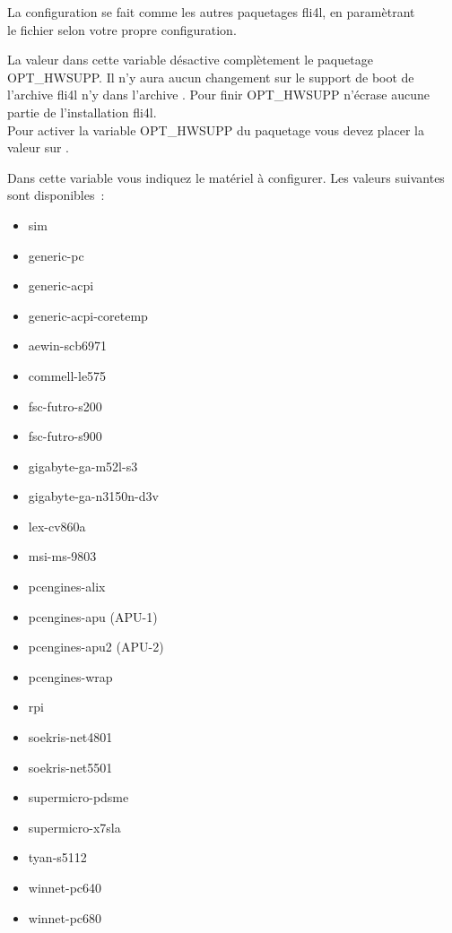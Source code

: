   La configuration se fait comme les autres paquetages fli4l, en paramètrant\\
  le fichier  selon votre
  propre configuration.

\begin{description}


  La valeur  dans cette variable désactive complètement le paquetage
  OPT\_HWSUPP. Il n'y aura aucun changement sur le support de boot de l'archive
  fli4l  n'y dans l'archive . Pour finir OPT\_HWSUPP
  n'écrase aucune partie de l'installation fli4l.\\
  Pour activer la variable OPT\_HWSUPP du paquetage  vous devez
  placer la valeur sur .


  Dans cette variable vous indiquez le matériel à configurer.
  Les valeurs suivantes sont disponibles~:
  \begin{itemize}
    \item sim
    \item generic-pc
    \item generic-acpi
    \item generic-acpi-coretemp
    \item aewin-scb6971
    \item commell-le575
    \item fsc-futro-s200
    \item fsc-futro-s900
    \item gigabyte-ga-m52l-s3
    \item gigabyte-ga-n3150n-d3v
    \item lex-cv860a
    \item msi-ms-9803
    \item pcengines-alix
    \item pcengines-apu (APU-1)
    \item pcengines-apu2 (APU-2)
    \item pcengines-wrap 
    \item rpi
    \item soekris-net4801
    \item soekris-net5501
    \item supermicro-pdsme
    \item supermicro-x7sla
    \item tyan-s5112
    \item winnet-pc640
    \item winnet-pc680 
  \end{itemize}


\end{description}
